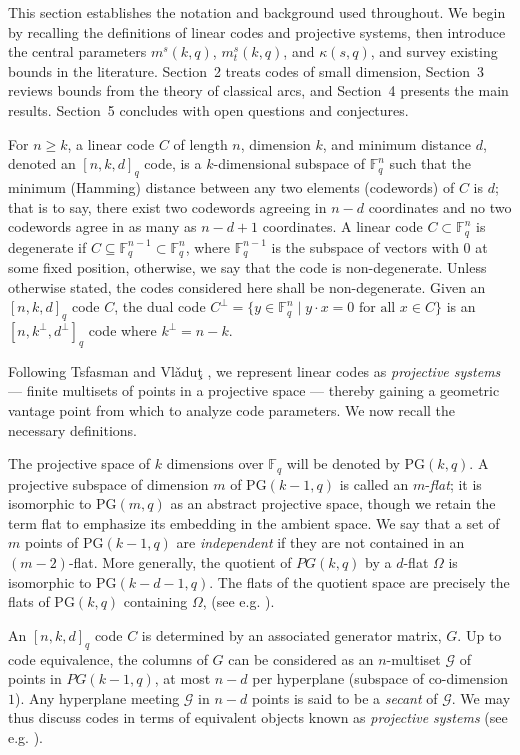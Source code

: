 \documentclass[11pt,a4paper]{amsart}
\newcommand{\F}{\mathbb{F}}
\newcommand{\G}{\mathcal{G}}
\theoremstyle{plain}
\theoremstyle{definition}
\theoremstyle{remark}
\begin{document}
	This section establishes the notation and background used throughout. We begin by recalling the definitions of linear codes and projective systems, then introduce the central parameters $m^s(k,q)$, $m^s_t(k,q)$, and $\kappa(s,q)$, and survey existing bounds in the literature. Section~2 treats codes of small dimension, Section~3 reviews bounds from the theory of classical arcs, and Section~4 presents the main results. Section~5 concludes with open questions and conjectures.

	For $n\geq k$, a linear code $C$ of length $n$, dimension $k$, and minimum distance $d$, denoted an $[n,k,d]_q$ code, is a $k$-dimensional subspace of $\F_q^n$ such that the minimum (Hamming) distance between any two elements (codewords) of $C$  is $d$; that is to say, there exist two codewords agreeing in $n-d$ coordinates and no two codewords agree in as many as $n-d+1$ coordinates.  A linear code $C \subset \mathbb{F}_q^n$ is degenerate if $C \subseteq \mathbb{F}_q^{n-1} \subset \mathbb{F}_q^n$, where $\mathbb{F}_q^{n-1}$ is the subspace of vectors with $0$ at some fixed position, otherwise, we say that the code is non-degenerate. Unless otherwise stated, the codes considered here shall be non-degenerate. Given an \([n, k, d]_q\) code \( C \), the dual code \(C^\perp = \{ y \in \mathbb{F}_q^n \mid y\cdot x = 0 \text{ for all } x \in C \}\) is an $[n,k^\perp, d^\perp]_q$ code where $k^\perp = n-k$.

	Following Tsfasman and Vl\v{a}du\c{t} \cite{Tsfasman2007}, we represent linear codes as \textit{projective systems} --- finite multisets of points in a projective space --- thereby gaining a geometric vantage point from which to analyze code parameters. We now recall the necessary definitions.

	The projective space of $ k$ dimensions over $\F_q$ will be denoted by PG$(k, q)$. A projective subspace of dimension $m$ of PG$(k-1,q)$ is called an $m$-\textit{flat}; it is isomorphic to PG$(m,q)$ as an abstract projective space, though we retain the term flat to emphasize its embedding in the ambient space. We say that a set of $m$ points of PG$(k-1, q)$ are \textit{independent} if they are not contained in an $(m-2)$-flat. More generally, the quotient of $PG(k,q)$ by a $d$-flat $\Omega$ is isomorphic to PG$(k-d-1,q)$. The flats of the quotient space are precisely the flats of PG$(k,q)$ containing $\Omega$, (see e.g. \cite{Ball2015}).

	An $[n, k, d]_q$ code $C$ is determined by an associated generator matrix, $G$. Up to code equivalence, the columns  of  $G$ can be considered as an $n$-multiset $\G$ of points in $PG(k-1,q)$,  at most $n-d$ per hyperplane (subspace of co-dimension $1$). Any hyperplane meeting $\G$ in $n-d$ points is said to be a \textit{secant} of $\G$.   We may thus discuss codes in terms of equivalent objects known as \textit{projective systems} (see e.g. \cite{Tsfasman2007}).
\end{document}

